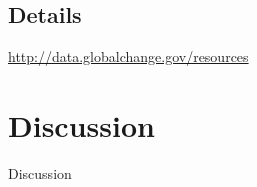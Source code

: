 \documentclass{beamer}
\begin{document}
\subsection{Details}
\begin{frame}
    \begin{center}
        \url{http://data.globalchange.gov/resources}
    \end{center}
\end{frame}

\section{Discussion}
\begin{frame}
    \begin{center}
        Discussion
    \end{center}
\end{frame}
\end{document}
